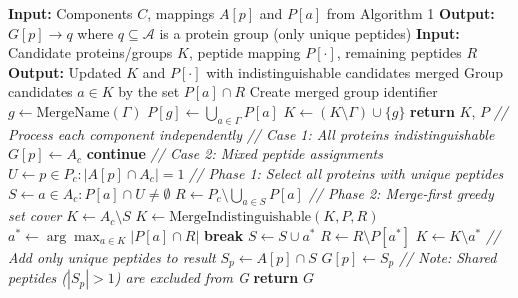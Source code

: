 \documentclass[pdflatex,sn-nature]{sn-jnl}
\begin{document}
\begin{algorithm}[H]
\caption{Protein Inference Phase 2: Component Processing with Merge-First
Set Cover}
\begin{algorithmic}[1]
\State \textbf{Input:} Components $C$, mappings $A[p]$ and $P[a]$ from
Algorithm 1
\State \textbf{Output:} $G[p] \to q$ where $q \subseteq \mathcal{A}$ is a protein group (only unique peptides)
\State
{}
  \State \textbf{Input:} Candidate proteins/groups $K$, peptide mapping $P[\cdot]$, remaining peptides $R$
  \State \textbf{Output:} Updated $K$ and $P[\cdot]$ with indistinguishable candidates merged
  \State Group candidates $a \in K$ by the set $P[a] \cap R$
      \State Create merged group identifier $g \gets \text{MergeName}(\Gamma)$ 
      \State $P[g] \gets \bigcup_{a \in \Gamma} P[a]$ 
      \State $K \gets (K \setminus \Gamma) \cup \{g\}$
  \EndFor
  \State \textbf{return} $K$, $P$
\EndFunction
\State
\State \textit{// Process each component independently}
  \State
  \State \textit{// Case 1: All proteins indistinguishable}
          \State $G[p] \gets A_c$ 
      \EndFor
      \State \textbf{continue}
  \EndIf
  \State
  \State \textit{// Case 2: Mixed peptide assignments}
  \State $U \gets p \in P_c : |A[p] \cap A_c| = 1$ 
  \State
  \State \textit{// Phase 1: Select all proteins with unique peptides}
  \State $S \gets a \in A_c : P[a] \cap U \neq \emptyset$
  \State $R \gets P_c \setminus \bigcup_{a \in S} P[a]$ 
  \State
  \State \textit{// Phase 2: Merge-first greedy set cover}
  \State $K \gets A_c \setminus S$ 
      \State $K \gets \text{MergeIndistinguishable}(K, P, R)$
      \State $a^* \gets \arg\max_{a \in K} |P[a] \cap R|$ 
          \State \textbf{break}
      \EndIf
      \State $S \gets S \cup a^*$ 
      \State $R \gets R \setminus P[a^*]$ 
      \State $K \gets K \setminus a^*$ 
  \EndWhile
  \State
  \State \textit{// Add only unique peptides to result}
      \State $S_p \gets A[p] \cap S$ 
          \State $G[p] \gets S_p$ 
      \EndIf
      \State \textit{// Note: Shared peptides ($|S_p| > 1$) are excluded from G}
  \EndFor
\EndFor
\State
\State \textbf{return} $G$
\end{algorithmic}
\end{algorithm}
\end{document}
